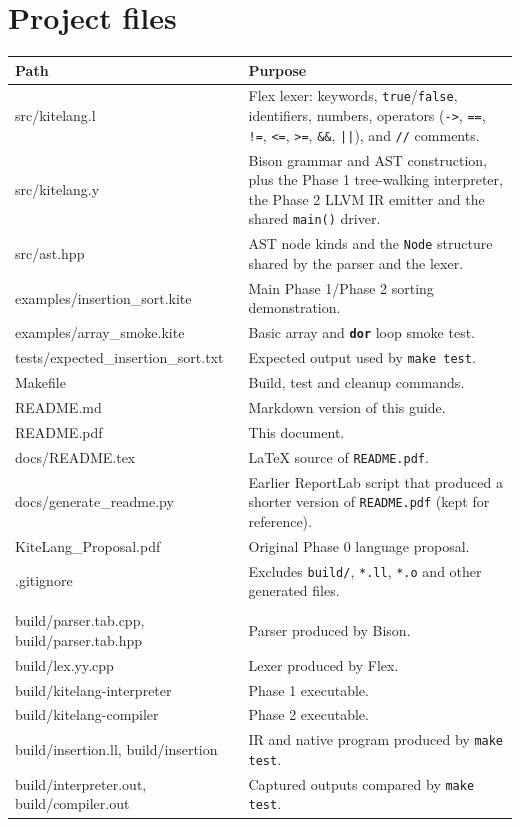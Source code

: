 \documentclass[11pt,a4paper]{article}
\newcommand{\kw}[1]{\texttt{\textcolor{cInput}{\textbf{#1}}}}
\newcommand{\fn}[1]{\texttt{#1}}
\begin{document}
\section{Project files}

\begin{longtable}{>{\ttfamily\raggedright}p{} >{\raggedright\arraybackslash}p{}}
\toprule
\textrm{\textbf{Path}} & \textbf{Purpose}\\
\midrule
\endhead
src/kitelang.l & Flex lexer: keywords, \fn{true}/\fn{false}, identifiers, numbers, operators (\fn{->}, \fn{==}, \fn{!=}, \fn{<=}, \fn{>=}, \fn{\&\&}, \fn{||}), and \fn{//} comments.\\
src/kitelang.y & Bison grammar and AST construction, plus the Phase 1 tree-walking interpreter, the Phase 2 LLVM IR emitter and the shared \fn{main()} driver.\\
src/ast.hpp & AST node kinds and the \fn{Node} structure shared by the parser and the lexer.\\
examples/insertion\_sort.kite & Main Phase 1/Phase 2 sorting demonstration.\\
examples/array\_smoke.kite & Basic array and \kw{dor} loop smoke test.\\
tests/\allowbreak expected\_insertion\_sort.txt & Expected output used by \fn{make test}.\\
Makefile & Build, test and cleanup commands.\\
README.md & Markdown version of this guide.\\
README.pdf & This document.\\
docs/README.tex & LaTeX source of \fn{README.pdf}.\\
docs/generate\_readme.py & Earlier ReportLab script that produced a shorter version of \fn{README.pdf} (kept for reference).\\
KiteLang\_Proposal.pdf & Original Phase 0 language proposal.\\
.gitignore & Excludes \fn{build/}, \fn{*.ll}, \fn{*.o} and other generated files.\\
\midrule
\multicolumn{2}{l}{\textit{Generated by \fn{make} (not committed):}}\\
build/parser.tab.cpp, build/parser.tab.hpp & Parser produced by Bison.\\
build/lex.yy.cpp & Lexer produced by Flex.\\
build/kitelang-interpreter & Phase 1 executable.\\
build/kitelang-compiler & Phase 2 executable.\\
build/insertion.ll, build/insertion & IR and native program produced by \fn{make test}.\\
build/interpreter.out, build/compiler.out & Captured outputs compared by \fn{make test}.\\
\bottomrule
\end{longtable}
\end{document}
